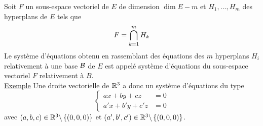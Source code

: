 \begin{defprop}
    Soit \(F\) un sous-espace vectoriel de \(E\) de dimension \(\dim E - m\) et \(H_1, \dots , H_m\) des hyperplans de \(E\) tels que
    \[F = \biginter^{m}_{k=1}H_k\]
    Le système d’équations obtenu en rassemblant des équations des \(m\) hyperplans \(H_i\) relativement à une base \(\cal{B}\) de \(E\) est appelé système d’équations du sous-espace vectoriel \(F\) relativement à \(B\).\\
    \underline{Exemple}
    Une droite vectorielle de \(\R^3\) a donc un système d’équations du type
    \[\begin{cases}
        ax + by + cz &= 0\\
        a'x + b'y + c'z &= 0
    \end{cases}\]
    avec \((a, b, c) \in  \R^3 \pd \accol{(0, 0, 0)}\) et \((a', b', c') \in  \R^3 \pd \accol{(0, 0, 0)}\).
\end{defprop}